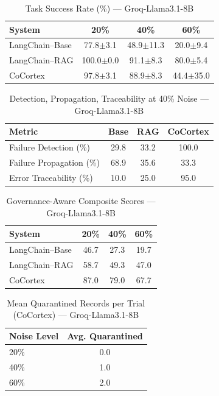 
\begin{table}[t]
\centering\footnotesize
\caption{Task Success Rate (\%) --- Groq-Llama3.1-8B}
\label{tab:success_groq_llama3.1_8b}
\begin{tabular}{@{}lccc@{}}\toprule
\textbf{System} & \textbf{20\%} & \textbf{40\%} & \textbf{60\%} \\
\midrule
LangChain--Base & 77.8$\pm$3.1 & 48.9$\pm$11.3 & 20.0$\pm$9.4 \\
LangChain--RAG & 100.0$\pm$0.0 & 91.1$\pm$8.3 & 80.0$\pm$5.4 \\
CoCortex & 97.8$\pm$3.1 & 88.9$\pm$8.3 & 44.4$\pm$35.0 \\
\bottomrule
\end{tabular}
\end{table}

\begin{table}[t]
\centering\footnotesize
\caption{Detection, Propagation, Traceability at 40\% Noise --- Groq-Llama3.1-8B}
\label{tab:detection_groq_llama3.1_8b}
\begin{tabular}{@{}lccc@{}}\toprule
\textbf{Metric} & \textbf{Base} & \textbf{RAG} & \textbf{CoCortex} \\
\midrule
Failure Detection (\%) & 29.8 & 33.2 & 100.0 \\
Failure Propagation (\%) & 68.9 & 35.6 & 33.3 \\
Error Traceability (\%) & 10.0 & 25.0 & 95.0 \\
\bottomrule
\end{tabular}
\end{table}

\begin{table}[t]
\centering\footnotesize
\caption{Governance-Aware Composite Scores --- Groq-Llama3.1-8B}
\label{tab:scores_groq_llama3.1_8b}
\begin{tabular}{@{}lccc@{}}\toprule
\textbf{System} & \textbf{20\%} & \textbf{40\%} & \textbf{60\%} \\
\midrule
LangChain--Base & 46.7 & 27.3 & 19.7 \\
LangChain--RAG & 58.7 & 49.3 & 47.0 \\
CoCortex & 87.0 & 79.0 & 67.7 \\
\bottomrule
\end{tabular}
\end{table}

\begin{table}[t]
\centering\footnotesize
\caption{Mean Quarantined Records per Trial (CoCortex) --- Groq-Llama3.1-8B}
\label{tab:quarantine_groq_llama3.1_8b}
\begin{tabular}{@{}lc@{}}\toprule
\textbf{Noise Level} & \textbf{Avg. Quarantined} \\
\midrule
20\% & 0.0 \\
40\% & 1.0 \\
60\% & 2.0 \\
\bottomrule
\end{tabular}
\end{table}
